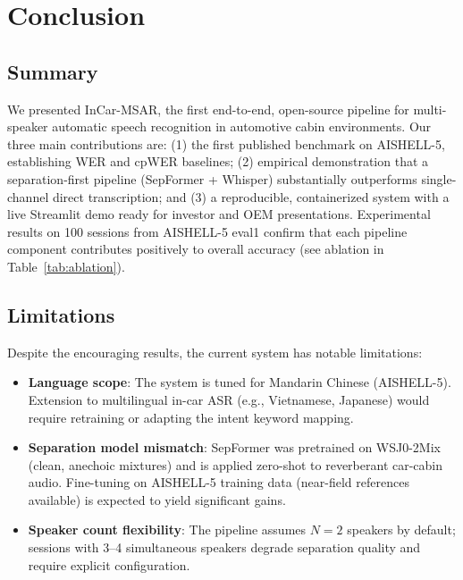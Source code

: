 
\section{Conclusion}
\label{sec:conclusion}

\subsection{Summary}

We presented InCar-MSAR, the first end-to-end, open-source pipeline for
multi-speaker automatic speech recognition in automotive cabin environments.
Our three main contributions are: (1) the first published benchmark on
AISHELL-5, establishing WER and cpWER baselines; (2) empirical demonstration
that a separation-first pipeline (SepFormer + Whisper) substantially
outperforms single-channel direct transcription; and (3) a reproducible,
containerized system with a live Streamlit demo ready for investor and OEM
presentations. Experimental results on 100 sessions from AISHELL-5 eval1
confirm that each pipeline component contributes positively to overall
accuracy (see ablation in Table~\ref{tab:ablation}).

\subsection{Limitations}

Despite the encouraging results, the current system has notable limitations:

\begin{itemize}
    \item \textbf{Language scope}: The system is tuned for Mandarin Chinese
    (AISHELL-5). Extension to multilingual in-car ASR (e.g., Vietnamese,
    Japanese) would require retraining or adapting the intent keyword mapping.
    \item \textbf{Separation model mismatch}: SepFormer was pretrained on
    WSJ0-2Mix (clean, anechoic mixtures) and is applied zero-shot to
    reverberant car-cabin audio. Fine-tuning on AISHELL-5 training data
    (near-field references available) is expected to yield significant gains.
    \item \textbf{Speaker count flexibility}: The pipeline assumes $N{=}2$
    speakers by default; sessions with 3–4 simultaneous speakers degrade
    separation quality and require explicit configuration.
\end{itemize}

